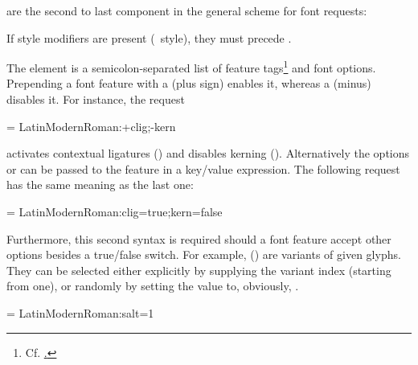 \endsubsubsection
\endsubsection
\endsection


 are the second to last component in the
general scheme for font requests:

\beginnarrower
  \nonproportional{:}%
  \nonproportional{:}%
\endnarrower

\noindent
If style modifiers are present (\XeTeX\ style), they must precede
.

The element  is a semicolon-separated list of feature
tags\footnote{%
  Cf. \hyperlink {http://www.microsoft.com/typography/otspec/featurelist.htm}.
}
and font options.
%
Prepending a font feature with a \inlinecode{+} (plus sign) enables it,
whereas a \inlinecode{-} (minus) disables it. For instance, the request

\beginlisting
  \font \test = LatinModernRoman:+clig;-kern
\endlisting

\noindent activates contextual ligatures () and
disables kerning ().
%
Alternatively the options  or  can
be passed to the feature in a key/value expression.
%
The following request has the same meaning as the last one:

\beginlisting
  \font \test = LatinModernRoman:clig=true;kern=false
\endlisting

\noindent
Furthermore, this second syntax is required should a font feature
accept other options besides a true/false switch.
%
For example,  () are
variants of given glyphs.
%
They can be selected either explicitly by supplying the variant
index (starting from one), or randomly by setting the value to,
obviously, .

\beginlisting
  \font \librmsaltfirst = LatinModernRoman:salt=1
\endlisting

\label{sec:mode}

\begindescriptions

